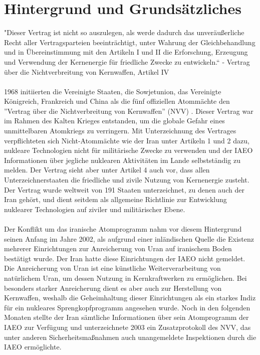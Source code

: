 \documentclass[a4paper,11pt]{article}
\begin{document}
	\section{Hintergrund und Grundsätzliches}
"Dieser Vertrag ist nicht so auszulegen, als werde dadurch das unveräußerliche Recht aller Vertragsparteien beeinträchtigt, unter Wahrung der Gleichbehandlung und in Übereinstimmung mit den Artikeln I und II die Erforschung, Erzeugung und Verwendung der Kernenergie für friedliche Zwecke zu entwickeln.“ - Vertrag über die Nichtverbreitung von Kernwaffen, Artikel IV
\\ \\
1968 initiierten die Vereinigte Staaten, die Sowjetunion, das Vereinigte Königreich, Frankreich und China als die fünf offiziellen Atommächte den ''Vertrag über die Nichtverbreitung von Kernwaffen'' (NVV) . Dieser Vertrag war im Rahmen des Kalten Krieges entstanden, um die globale Gefahr eines unmittelbaren Atomkriegs zu verringern. Mit Unterzeichnung des Vertrages verpflichteten sich Nicht-Atommächte wie der Iran unter Artikeln 1 und 2 dazu, nukleare Technologien nicht für militärische Zwecke zu verwenden und der IAEO Informationen über jegliche nuklearen Aktivitäten im Lande selbstständig zu melden. Der Vertrag sieht aber unter Artikel 4 auch vor, dass allen Unterzeichnerstaaten die friedliche und zivile Nutzung von Kernenergie zusteht. Der Vertrag wurde weltweit von 191 Staaten unterzeichnet, zu denen auch der Iran gehört, und dient seitdem als allgemeine Richtlinie zur Entwicklung nuklearer Technologien auf ziviler und militärischer Ebene.
\\ \\
Der Konflikt um das iranische Atomprogramm nahm vor diesem Hintergrund seinen Anfang im Jahre 2002, als aufgrund einer inländischen Quelle die Existenz mehrerer Einrichtungen zur Anreicherung von Uran auf iranischem Boden bestätigt wurde. Der Iran hatte diese Einrichtungen der IAEO nicht gemeldet. Die Anreicherung von Uran ist eine künstliche Weiterverarbeitung von natürlichem Uran, um dessen Nutzung in Kernkraftwerken zu ermöglichen. Bei besonders starker Anreicherung dient es aber auch zur Herstellung von Kernwaffen, weshalb die Geheimhaltung dieser Einrichtungen als ein starkes Indiz für ein nukleares Sprengkopfprogramm angesehen wurde. Noch in den folgenden Monaten stellte der Iran sämtliche Informationen über sein Atomprogramm der IAEO zur Verfügung und unterzeichnete 2003 ein Zusatzprotokoll des NVV, das unter anderen Sicherheitsmaßnahmen auch unangemeldete Inspektionen durch die IAEO ermöglichte.
\end{document}
